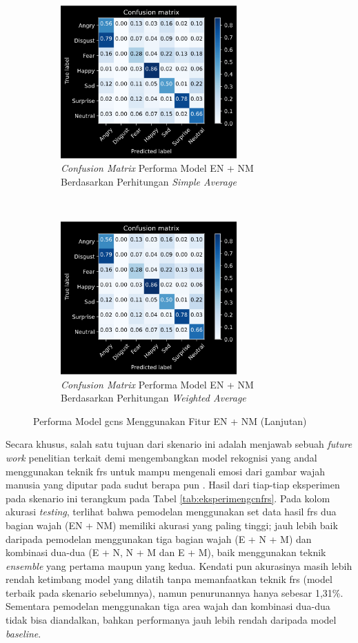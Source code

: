 \begin{figure}[t]
    \ContinuedFloat
    \centering
    \begin{subfigure}[t]{6.75cm}
        \includegraphics[width=6.75cm]{gambar/eksperimen4b1_matriks3.png}
        \caption{\textit{Confusion Matrix} Performa Model EN + NM Berdasarkan Perhitungan \textit{Simple Average}}
        \label{fig:confusionmatrixeksperimen4b13}
    \end{subfigure}
    ~~~
    \begin{subfigure}[t]{6.75cm}
        \includegraphics[width=6.75cm]{gambar/eksperimen4b1_matriks4.png}
        \caption{\textit{Confusion Matrix} Performa Model EN + NM Berdasarkan Perhitungan \textit{Weighted Average}}
        \label{fig:confusionmatrixeksperimen4b14}
    \end{subfigure}
    \caption{Performa Model \acrshort{gcns} Menggunakan Fitur EN + NM (Lanjutan)}
\end{figure}
Secara khusus, salah satu tujuan dari skenario ini adalah menjawab sebuah \textit{future work} penelitian terkait demi mengembangkan model rekognisi yang andal menggunakan teknik \acrshort{frs} untuk mampu mengenali emosi dari gambar wajah manusia yang diputar pada sudut berapa pun . Hasil dari tiap-tiap eksperimen pada skenario ini terangkum pada Tabel \ref{tab:eksperimengcnfrs}. Pada kolom akurasi \textit{testing}, terlihat bahwa pemodelan menggunakan set data hasil \acrshort{frs} dua bagian wajah (EN + NM) memiliki akurasi yang paling tinggi; jauh lebih baik daripada pemodelan menggunakan tiga bagian wajah (E + N + M) dan kombinasi dua-dua (E + N, N + M dan E + M), baik menggunakan teknik \textit{ensemble} yang pertama maupun yang kedua. Kendati pun akurasinya masih lebih rendah ketimbang model yang dilatih tanpa memanfaatkan teknik \acrshort{frs} (model terbaik pada skenario sebelumnya), namun penurunannya hanya sebesar 1,31\%. Sementara pemodelan menggunakan tiga area wajah dan kombinasi dua-dua tidak bisa diandalkan, bahkan performanya jauh lebih rendah daripada model \textit{baseline}.

